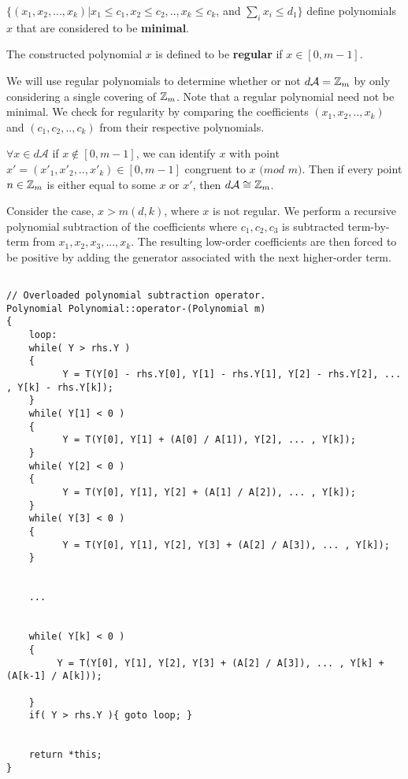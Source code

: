 \begin{proposition} 
$ \{ (x_1, x_2, ... , x_k) \vert x_{1} \leq c_1, x_{2} \leq c_2, .. , x_{k} \leq c_k$, and $\sum_{i} x_i \leq d_{1} \}$ define polynomials $x$ that are considered to be \textbf{minimal}.\n
\end{proposition}
\begin{proposition}
The constructed polynomial $x$ is defined to be \textbf{regular} if $x \in [0, m-1]$.
\end{proposition}
We will use regular polynomials to determine whether or not $d \mathcal{A} = \mbox{$\mathbb Z$}_m$ by only considering a single covering of $\mbox{$\mathbb Z$}_m$.\n
\noindent
Note that a regular polynomial need not be minimal.\n
\noindent
We check for regularity by comparing the coefficients $(x_1, x_2, .. , x_{k})$ and $(c_1, c_2, .. , c_k)$ from their respective polynomials.\n

\begin{proposition}
$\forall x \in d \mathcal{A}$ if $x \notin [0, m-1]$, we can identify $x$ with point $x' = (x'_1, x'_2, .. , x'_k) \in [0, m-1]$ congruent to $x$ $(mod$ $m)$.  Then if every point $n \in \mbox{$\mathbb Z$}_m$ is either equal to some $x$ or $x'$, then $d \mathcal{A} \cong \mbox{$\mathbb Z$}_m$.\n
\end{proposition}

\noindent
Consider the case, $x > m(d, k)$, where $x$ is not regular. We perform a recursive polynomial subtraction of the coefficients where $c_1, c_2, c_3$ is subtracted term-by-term from $x_1, x_2, x_3, ... , x_k$. The resulting low-order coefficients are then forced to be positive by adding the generator associated with the next higher-order term.\n

\begin{lstlisting}

// Overloaded polynomial subtraction operator.
Polynomial Polynomial::operator-(Polynomial m)
{
    loop:
    while( Y > rhs.Y )
    {
          Y = T(Y[0] - rhs.Y[0], Y[1] - rhs.Y[1], Y[2] - rhs.Y[2], ... , Y[k] - rhs.Y[k]);
    }
    while( Y[1] < 0 )
    {
          Y = T(Y[0], Y[1] + (A[0] / A[1]), Y[2], ... , Y[k]);
    }
    while( Y[2] < 0 )
    {
          Y = T(Y[0], Y[1], Y[2] + (A[1] / A[2]), ... , Y[k]);
    }
    while( Y[3] < 0 )
    {
          Y = T(Y[0], Y[1], Y[2], Y[3] + (A[2] / A[3]), ... , Y[k]);
    }


    ...


    while( Y[k] < 0 )
    {
         Y = T(Y[0], Y[1], Y[2], Y[3] + (A[2] / A[3]), ... , Y[k] + (A[k-1] / A[k]));

    }
    if( Y > rhs.Y ){ goto loop; } 


    return *this;
}
\end{lstlisting}

